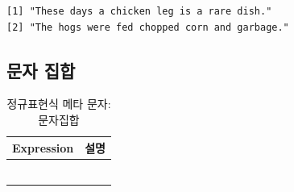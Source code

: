 \documentclass[
  11pt,
]{krantz}
\begin{document}
\begin{verbatim}
[1] "These days a chicken leg is a rare dish."   
[2] "The hogs were fed chopped corn and garbage."
\end{verbatim}

\normalsize

\hypertarget{character-set}{%
\subsection{문자 집합}\label{character-set}}

\footnotesize

\begin{table}[H]

\caption{\label{tab:meta-char2}정규표현식 메타 문자: 문자집합}
\centering
\fontsize{12}{14}\selectfont
\begin{tabu} to 
\toprule
Expression & 설명\\
\midrule
{} & \\
 & \\
 & \\
 & \\
 & \\
\addlinespace
{} & \\
\bottomrule
\end{tabu}
\end{table}

\normalsize

\footnotesize
\end{document}
